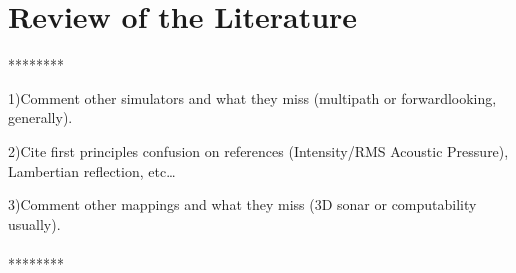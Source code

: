 \section{Review of the Literature}

********

1)Comment other simulators and what they miss (multipath or forwardlooking,
generally).

2)Cite first principles confusion on references (Intensity/RMS Acoustic
Pressure), Lambertian reflection, etc\ldots

3)Comment other mappings and what they miss (3D sonar or computability usually).
\\\\
******** 
